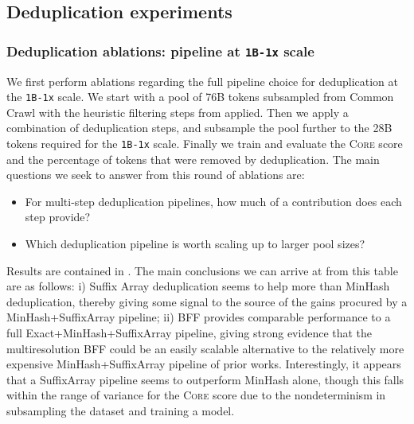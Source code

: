 \documentclass{article}
\newcommand{\strack}{\texttt{1B-1x}\xspace}
\newcommand{\lowvar}{\textsc{Core}\xspace}
\newcommand{\commoncrawl}{Common Crawl\xspace}
\begin{document}
\subsection{Deduplication experiments}

\subsubsection{Deduplication ablations: pipeline at \strack scale}\label{subsubsec:dedup-strack}
We first perform ablations regarding the full pipeline choice for deduplication at the \strack scale. We start with a pool of 76B tokens subsampled from \commoncrawl with the heuristic filtering steps from \citet{refinedweb} applied. Then we apply a combination of deduplication steps, and subsample the pool further to the 28B tokens required for the \strack scale. Finally we train and evaluate the \lowvar score and the percentage of tokens that were removed by deduplication. The main questions we seek to answer from this round of ablations are:
\begin{itemize}
\item For multi-step deduplication pipelines, how much of a contribution does each step provide?
\item Which deduplication pipeline is worth scaling up to larger pool sizes?
\end{itemize}
Results are contained in . The main conclusions we can arrive at from this table are as follows: i) Suffix Array deduplication seems to help more than MinHash deduplication, thereby giving some signal to the source of the gains procured by a MinHash+SuffixArray pipeline; ii) BFF provides comparable performance to a full Exact+MinHash+SuffixArray pipeline, giving strong evidence that the multiresolution BFF could be an easily scalable alternative to the relatively more expensive MinHash+SuffixArray pipeline of prior works. Interestingly, it appears that a SuffixArray pipeline seems to outperform MinHash alone, though this falls within the range of variance for the \lowvar score due to the nondeterminism in subsampling the dataset and training a model.
\end{document}
